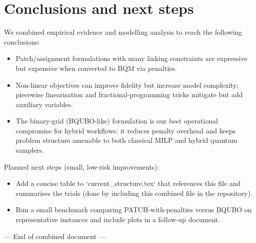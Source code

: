 \documentclass[11pt,a4paper]{article}
\begin{document}
\section{Conclusions and next steps}

We combined empirical evidence and modelling analysis to reach the following conclusions:
\begin{itemize}
    \item Patch/assignment formulations with many linking constraints are expressive but expensive when converted to BQM via penalties.
    \item Non-linear objectives can improve fidelity but increase model complexity; piecewise linearisation and fractional-programming tricks mitigate but add auxiliary variables.
    \item The binary-grid (BQUBO-like) formulation is our best operational compromise for hybrid workflows: it reduces penalty overhead and keeps problem structure amenable to both classical MILP and hybrid quantum samplers.
\end{itemize}

Planned next steps (small, low-risk improvements):
\begin{itemize}
    \item Add a concise table to `current_structure.tex` that references this file and summarises the trials (done by including this combined file in the repository).
    \item Run a small benchmark comparing PATCH-with-penalties versus BQUBO on representative instances and include plots in a follow-up document.
\end{itemize}

\vspace{1em}
\noindent--- End of combined document ---
\end{document}
